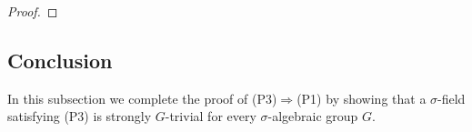 \documentclass[oneside,reqno]{amsart}
\theoremstyle{definition}
\newcommand{\G}{\mathcal{G}}
\newcommand{\N}{\mathcal{N}}
\newcommand{\s}{\sigma}
\newcommand{\Gm}{\mathbb{G}_m}
\newcommand{\Ga}{\mathbb{G}_a}
\newcommand{\sred}{{\sigma\text{-}\operatorname{red}}}
\newcommand{\poweak}{{\rm{(P1)}}}
\newcommand{\ptweak}{{\rm{(P3)}}}
\begin{document}
\begin{proof}
%	
%
%
%
%	
%
\end{proof}














\subsection{Conclusion}

\label{sec: positive sdim}

In this subsection we complete the proof of \ptweak{}$\Rightarrow$\poweak{} by showing that a $\s$-field satisfying \ptweak{} is strongly $G$-trivial for every $\s$-algebraic group $G$.
\end{document}
